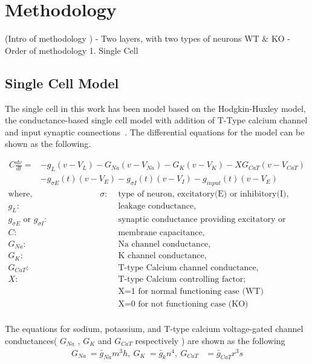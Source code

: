 \chapter{Methodology}

(Intro of methodology )
- Two layers, with two types of neurons  WT \& KO 
- Order of methodology 
1. Single Cell  

\section{Single Cell Model}

The single cell in this work has been model based on the Hodgkin-Huxley model, the conductance-based single cell model with addition of T-Type calcium channel and input synaptic connections~\cite{hodgkin1952quantitative, wang1991model, paik2009spontaneous}. The differential equations for the model can be shown as the following.

\begin{align*}
C\frac{dv}{dt}=&-g_L(v - V_L) - G_{Na}(v - V_{Na}) - G_K(v - V_K) - XG_{CaT}(v - V_{CaT}) \\
&- g_{\sigma E}(t)(v - V_E) - g_{\sigma I}(t)(v - V_I) - g_{input}(t)(v - V_E)
\end{align*}
\begin{align*}
	\text{where,} \hspace{8em} \sigma :& \text{ type of neuron, excitatory(E) or inhibitory(I),}  \\
	g_L :& \text{ leakage conductance,} \\
	g_{\sigma E} \text{ or } g_{\sigma I} :& \text{ synaptic conductance providing excitatory or inhibitory input} \\
	C :& \text{ membrane capacitance,}\\
	G_{Na} :& \text{ Na channel conductance,}\\
	G_{K} :& \text{ K channel conductance,}\\
	G_{CaT} :& \text{ T-type Calcium channel conductance,}\\
	X :& \text{ T-type Calcium controlling factor;}\\
	   &  \text{ X=1 for normal functioning case (WT) }\\
	   &  \text{ X=0 for not functioning case (KO) }\\
\end{align*}

The equations for sodium, potassium, and T-type calcium voltage-gated channel conductances( $G_{Na}$ , $G_{K}$ and $G_{CaT}$ respectively ) are shown as the following
\begin{align*} 
G_{Na}\ =\bar{g}_{Na}m^{3}h ,\: G_{K}\ =\bar{g}_{k}n^{4},\: G_{CaT}&=\bar{g}_{CaT} r^{3}s\\
\end{align*}


